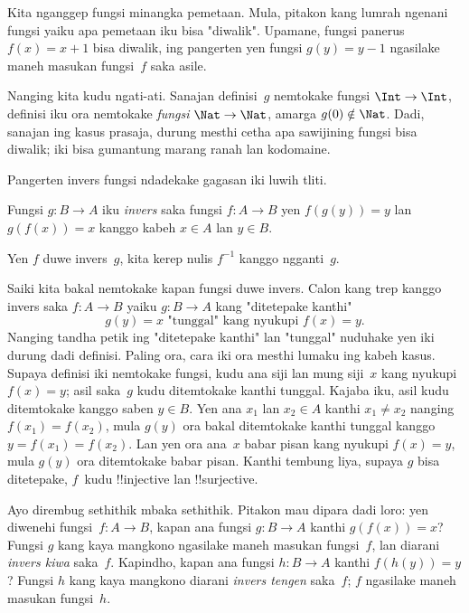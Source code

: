 \documentclass[../../../include/open-logic-section]{subfiles}
\begin{document}

\begin{explain}
Kita nganggep fungsi minangka pemetaan. Mula, pitakon kang lumrah
ngenani fungsi yaiku apa pemetaan iku bisa "diwalik". Upamane,
fungsi panerus $f(x) = x + 1$ bisa diwalik,
ing pangerten yen fungsi $g(y) = y - 1$ ngasilake maneh masukan
fungsi~$f$ saka asile.

Nanging kita kudu ngati-ati. Sanajan definisi~$g$ nemtokake
fungsi $\Int \to \Int$, definisi iku ora nemtokake \emph{fungsi} $\Nat
\to \Nat$, amarga $g(0) \notin \Nat$. Dadi, sanajan ing kasus prasaja,
durung mesthi cetha apa sawijining fungsi bisa diwalik; iki bisa
gumantung marang ranah lan kodomaine.

Pangerten invers fungsi ndadekake gagasan iki luwih tliti.
\end{explain}

\begin{defn}
Fungsi $g \colon B \to A$ iku \emph{invers} saka fungsi $f
\colon A \to B$ yen $f(g(y)) = y$ lan $g(f(x)) = x$ kanggo kabeh $x \in A$
lan $y \in B$.
\end{defn}

Yen $f$ duwe invers~$g$, kita kerep nulis $f^{-1}$ kanggo ngganti~$g$.

\begin{explain}
Saiki kita bakal nemtokake kapan fungsi duwe invers. Calon kang trep
kanggo invers saka $f\colon A \to B$ yaiku $g\colon B \to A$ kang
"ditetepake kanthi"
\[
g(y) = \text{$x$ "tunggal" kang nyukupi $f(x) = y$.}
\]
Nanging tandha petik ing "ditetepake kanthi" lan "tunggal" nuduhake
yen iki durung dadi definisi. Paling ora, cara iki ora mesthi lumaku
ing kabeh kasus. Supaya definisi iki nemtokake
fungsi, kudu ana siji lan mung siji~$x$ kang nyukupi $f(x) =
y$; asil saka~$g$ kudu ditemtokake kanthi tunggal. Kajaba iku, asil
kudu ditemtokake kanggo saben $y \in B$. Yen ana $x_1$ lan $x_2 \in
A$ kanthi $x_1 \neq x_2$ nanging $f(x_1) = f(x_2)$, mula $g(y)$ ora bakal
ditemtokake kanthi tunggal kanggo $y = f(x_1) = f(x_2)$. Lan yen ora ana~$x$
babar pisan kang nyukupi $f(x) = y$, mula $g(y)$ ora ditemtokake babar pisan.
Kanthi tembung liya, supaya $g$ bisa ditetepake, $f$~kudu !!{injective} lan
!!{surjective}.

Ayo dirembug sethithik mbaka sethithik. Pitakon mau dipara dadi loro:
yen diwenehi fungsi~$f\colon A \to B$, kapan ana fungsi $g\colon B \to A$
kanthi $g(f(x)) = x$? Fungsi $g$ kang kaya mangkono ngasilake maneh
masukan fungsi~$f$,
lan diarani \emph{invers kiwa} saka~$f$. Kapindho, kapan ana
fungsi $h\colon B \to A$ kanthi $f(h(y)) = y$? Fungsi $h$ kang kaya mangkono
diarani \emph{invers tengen} saka~$f$; $f$ ngasilake maneh masukan
fungsi~$h$.
\end{explain}
\end{document}
